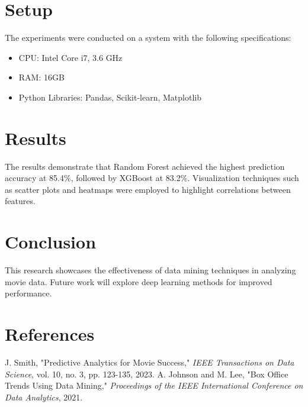 \documentclass[conference]{IEEEtran}
\begin{document}
\section{Setup}
The experiments were conducted on a system with the following specifications:
\begin{itemize}
    \item CPU: Intel Core i7, 3.6 GHz
    \item RAM: 16GB
    \item Python Libraries: Pandas, Scikit-learn, Matplotlib
\end{itemize}

\section{Results}
The results demonstrate that Random Forest achieved the highest prediction accuracy at 85.4\%, followed by XGBoost at 83.2\%. Visualization techniques such as scatter plots and heatmaps were employed to highlight correlations between features.

\section{Conclusion}
This research showcases the effectiveness of data mining techniques in analyzing movie data. Future work will explore deep learning methods for improved performance.

\section*{References}
\begin{thebibliography}{00}
 J. Smith, "Predictive Analytics for Movie Success," \textit{IEEE Transactions on Data Science}, vol. 10, no. 3, pp. 123-135, 2023.
 A. Johnson and M. Lee, "Box Office Trends Using Data Mining," \textit{Proceedings of the IEEE International Conference on Data Analytics}, 2021.
\end{thebibliography}
\end{document}

